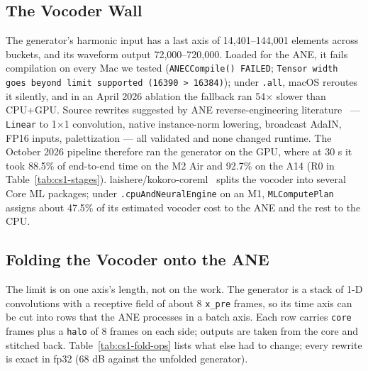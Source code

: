 \documentclass[11pt]{article}
\newcommand{\code}[1]{\texttt{#1}}
\begin{document}
\subsection{The Vocoder Wall}\label{sec:cs1-wall}

The generator's harmonic input has a last axis of 14,401--144,001 elements across buckets, and its waveform output 72,000--720,000. Loaded for the ANE, it fails compilation on every Mac we tested (\code{ANECCompile() FAILED}; \code{Tensor width goes beyond limit supported (16390 > 16384)}); under \code{.all}, macOS reroutes it silently, and in an April 2026 ablation the fallback ran 54$\times$ slower than CPU+GPU. Source rewrites suggested by ANE reverse-engineering literature~\citep{orion,ane-field-guide} --- \code{Linear} to 1$\times$1 convolution, native instance-norm lowering, broadcast AdaIN, FP16 inputs, palettization --- all validated and none changed runtime. The October 2026 pipeline therefore ran the generator on the GPU, where at 30 s it took 88.5\% of end-to-end time on the M2 Air and 92.7\% on the A14 (R0 in Table~\ref{tab:cs1-stages}). laishere/kokoro-coreml~\citep{laishere} splits the vocoder into several Core ML packages; under \code{.cpuAndNeuralEngine} on an M1, \code{MLComputePlan} assigns about 47.5\% of its estimated vocoder cost to the ANE and the rest to the CPU.

\subsection{Folding the Vocoder onto the ANE}\label{sec:cs1-fold}

The limit is on one axis's length, not on the work. The generator is a stack of 1-D convolutions with a receptive field of about 8 \code{x\_pre} frames, so its time axis can be cut into rows that the ANE processes in a batch axis. Each row carries \code{core} frames plus a \code{halo} of 8 frames on each side; outputs are taken from the core and stitched back. Table~\ref{tab:cs1-fold-ops} lists what else had to change; every rewrite is exact in fp32 (68 dB against the unfolded generator).
\end{document}
